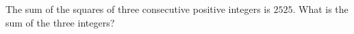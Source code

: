 The sum of the squares of three consecutive positive integers is $2525$. What is the sum of the three integers?

